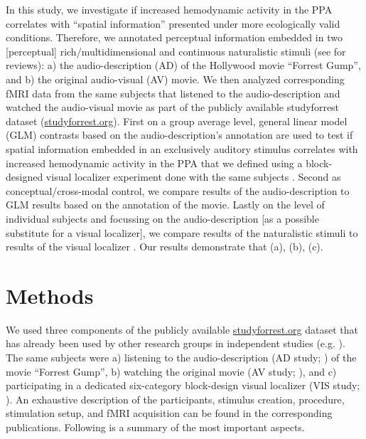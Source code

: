 \documentclass[english]{article}
\begin{document}
In this study, we investigate if increased hemodynamic activity in the PPA
correlates with ``spatial information'' presented under more ecologically valid
conditions.
Therefore, we annotated perceptual information embedded in two [perceptual]
rich/multidimensional and continuous naturalistic stimuli (see
\citep{hamilton2018revolution, hasson2008neurocinematics,
sonkusare2019naturalistic} for reviews):
a) the audio-description (AD) of the Hollywood movie ``Forrest Gump'',
and
b) the original audio-visual (AV) movie.
We then analyzed corresponding fMRI data from the same subjects that listened
to the audio-description and watched the audio-visual movie as part of the
publicly available studyforrest dataset
(\href{http://www.studyforrest.org}{studyforrest.org}).
First on a group average level, general linear model (GLM) contrasts based on
the audio-description's annotation are used to test if spatial information
embedded in an exclusively auditory stimulus correlates with increased
hemodynamic activity in the PPA that we defined using a block-designed visual
localizer experiment done with the same subjects \citep{sengupta2016extension}.
Second as conceptual/cross-modal control, we compare results of the
audio-description to GLM results based on the annotation of the movie.
Lastly on the level of individual subjects and focussing on the
audio-description [as a possible substitute for a visual localizer], we compare
results of the naturalistic stimuli to results of the visual localizer
\citep{sengupta2016extension}.
 Our results demonstrate that (a), (b), (c).


\section{Methods}


We used three components of the publicly available
\href{http://www.studyforrest.org}{studyforrest.org} dataset that has already been
used by other research groups in independent studies
(e.g. \citep{ben2018hippocampal, jiahui2019predicting, hu2017decoding,
lettieri2019emotionotopy, nguyen2016integration}).
The same subjects were
a) listening to the audio-description (AD study; \citep{hanke2014audiomovie}) of
the movie ``Forrest Gump'',
b) watching the original movie (AV study;
\citep{hanke2016simultaneous}), and
c) participating in a dedicated six-category block-design visual localizer (VIS
study; \citep{sengupta2016extension}).
An exhaustive description of the participants, stimulus creation, procedure,
stimulation setup, and fMRI acquisition can be found in the corresponding
publications. Following is a summary of the most important aspects.
\end{document}
